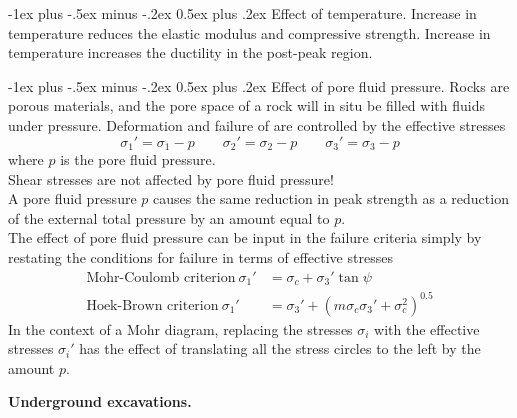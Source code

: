 \documentclass[10pt,landscape,a4paper]{article}
\makeatletter
\newcounter{Chapcounter}
\newcommand{\chapter}[1]{{\addtocounter{Chapcounter}{1}\fontsize{17}{16}\textbf{#1}}}
\renewcommand{\section}{\@startsection{section}{1}{0mm}%
	{-1ex plus -.5ex minus -.2ex}%
	{0.5ex plus .2ex}%
	{\normalfont\large\bfseries}}
\makeatother
\begin{document}
\begin{multicols}{3}
	\section{Effect of temperature.}
	Increase in temperature reduces the elastic modulus and compressive strength.
	Increase in temperature increases the ductility in the post-peak region.
	
	\section{Effect of pore fluid pressure.}
	Rocks are porous materials, and the pore space of a rock will in situ be filled with fluids under pressure.
	Deformation and failure of are controlled by the effective stresses
	\[
		\sigma_1'=\sigma_1-p \qquad \sigma_2'=\sigma_2-p \qquad \sigma_3'=\sigma_3-p
	\]
	where $p$ is the pore fluid pressure.\\
	Shear stresses are not affected by pore fluid pressure!\\
	A pore fluid pressure $p$ causes the same reduction in peak strength as a reduction of the external total pressure by an amount equal to $p$.\\
	The effect of pore fluid pressure can be input in the failure criteria simply by restating the conditions for failure in terms of effective stresses
	\begin{align*}
		\text{Mohr-Coulomb criterion} \ \sigma_1' & =\sigma_c+\sigma_3'\tan\psi                      \\
		\text{Hoek-Brown criterion} \ \sigma_1'   & =\sigma_3'+(m\sigma_c\sigma_3'+\sigma_c^2)^{0.5}
	\end{align*}
	In the context of a Mohr diagram, replacing the stresses $\sigma_i$ with the effective stresses $\sigma_i'$ has the effect of translating all the stress circles to the left by the amount $p$.
	
	\chapter{Underground excavations.}
	

\end{multicols}
\end{document}
